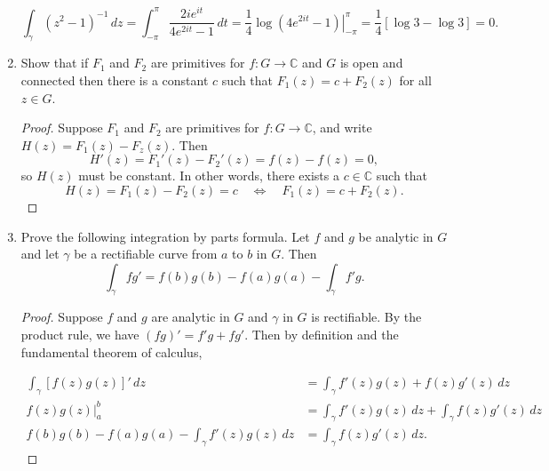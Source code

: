 \documentclass[11pt,oneside,english]{amsart}
\theoremstyle{definition}
\newcommand{\MB}[1]{\mathbb{#1}}
\begin{document}
\begin{enumerate}[leftmargin=*]
\[
\int_\gamma (z^2-1)^{-1}\,dz=\int_{-\pi}^\pi\frac{2ie^{it}}{4e^{2it}-1}\,dt=\frac{1}{4}\left.\log(4e^{2it}-1)\right|_{-\pi}^\pi=\frac{1}{4}[\log3-\log3]=0.
\]

\item Show that if $F_1$ and $F_2$ are primitives for $f:G\to\MB{C}$ and $G$ is open and connected then there is a constant $c$ such that $F_1(z)=c+F_2(z)$ for all $z\in G$.

\begin{proof}
Suppose $F_1$ and $F_2$ are primitives for $f:G\to\MB{C}$, and write $H(z)=F_1(z)-F_z(z)$. Then
\[
H'(z)=F_1'(z)-F_2'(z)=f(z)-f(z)=0,
\]
so $H(z)$ must be constant. In other words, there exists a $c\in \MB{C}$ such that 
\[
H(z)=F_1(z)-F_2(z)=c \quad \iff \quad F_1(z)=c+F_2(z).
\]
\end{proof}


\setcounter{enumi}{22}

\item Prove the following integration by parts formula. Let $f$ and $g$ be analytic in $G$ and let $\gamma$ be a rectifiable curve from $a$ to $b$ in $G$. Then
\[
\int_\gamma fg'=f(b)g(b)-f(a)g(a)-\int_\gamma f'g.
\]

\begin{proof}
Suppose $f$ and $g$ are analytic in $G$ and $\gamma$ in $G$ is rectifiable. By the product rule, we have $(fg)'=f'g+fg'$. Then by definition and the fundamental theorem of calculus,

\begin{align*}
\int_\gamma[f(z)g(z)]'\,dz&=\int_\gamma f'(z)g(z)+f(z)g'(z)\,dz\\[2mm]
\left.f(z)g(z)\right|_a^b&=\int_\gamma f'(z)g(z)\,dz+\int_\gamma f(z)g'(z)\,dz\\[2mm]
f(b)g(b)-f(a)g(a)-\int_\gamma f'(z)g(z)\,dz&=\int_\gamma f(z)g'(z)\,dz.
\end{align*}


\end{proof}

\end{enumerate}
\end{document}

